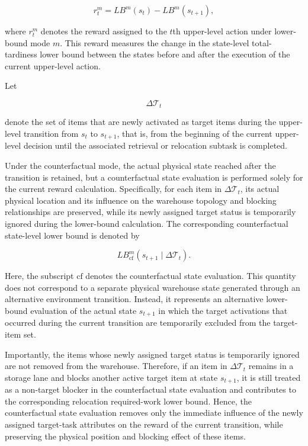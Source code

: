 \[
r_t^m
=
LB^m(s_t)-LB^m(s_{t+1}),
\]

where $r_t^m$ denotes the reward assigned to the $t$th upper-level action under lower-bound mode $m$. This reward measures the change in the state-level total-tardiness lower bound between the states before and after the execution of the current upper-level action.

Let

\[
\Delta\mathcal{T}_t
\]

denote the set of items that are newly activated as target items during the upper-level transition from $s_t$ to $s_{t+1}$, that is, from the beginning of the current upper-level decision until the associated retrieval or relocation subtask is completed.

Under the counterfactual mode, the actual physical state reached after the transition is retained, but a counterfactual state evaluation is performed solely for the current reward calculation. Specifically, for each item in $\Delta\mathcal{T}_t$, its actual physical location and its influence on the warehouse topology and blocking relationships are preserved, while its newly assigned target status is temporarily ignored during the lower-bound calculation. The corresponding counterfactual state-level lower bound is denoted by

\[
LB_{\mathrm{cf}}^m
\left(
s_{t+1}\mid\Delta\mathcal{T}_t
\right).
\]

Here, the subscript $\mathrm{cf}$ denotes the counterfactual state evaluation. This quantity does not correspond to a separate physical warehouse state generated through an alternative environment transition. Instead, it represents an alternative lower-bound evaluation of the actual state $s_{t+1}$ in which the target activations that occurred during the current transition are temporarily excluded from the target-item set.

Importantly, the items whose newly assigned target status is temporarily ignored are not removed from the warehouse. Therefore, if an item in $\Delta\mathcal{T}_t$ remains in a storage lane and blocks another active target item at state $s_{t+1}$, it is still treated as a non-target blocker in the counterfactual state evaluation and contributes to the corresponding relocation required-work lower bound. Hence, the counterfactual state evaluation removes only the immediate influence of the newly assigned target-task attributes on the reward of the current transition, while preserving the physical position and blocking effect of these items.

